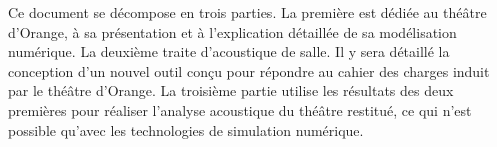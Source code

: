Ce document se décompose en trois parties. La première est dédiée au théâtre d'Or\-ange, à sa présentation et à l'explication détaillée de sa modélisation numérique. La deux\-ième traite d'acoustique de salle. Il y sera détaillé la conception d'un nouvel outil conçu pour répondre au cahier des charges induit par le théâtre d'Orange. La troisième partie utilise les résultats des deux premières pour réaliser l'analyse acoustique du théâtre restitué, ce qui n'est possible qu'avec les technologies de simulation numérique. 

	